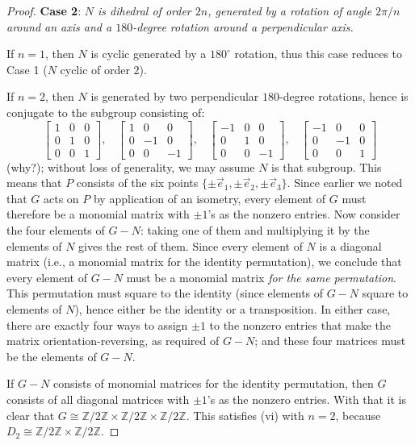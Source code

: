 \documentclass[leqno]{book}
\begin{document}
\begin{proof}
\noindent\textbf{Case 2}: \emph{$N$ is dihedral of order $2n$, generated by a rotation of angle $2\pi/n$ around an axis and a $180$-degree rotation around a perpendicular axis.}

If $n=1$, then $N$ is cyclic generated by a $180^\circ$ rotation, thus this case reduces to Case 1 ($N$ cyclic of order $2$).

If $n=2$, then $N$ is generated by two perpendicular $180$-degree rotations, hence is conjugate to the subgroup consisting of:
$$\begin{bmatrix}1&0&0\\0&1&0\\0&0&1\end{bmatrix},~~~~\begin{bmatrix}1&0&0\\0&-1&0\\0&0&-1\end{bmatrix},~~~~\begin{bmatrix}-1&0&0\\0&1&0\\0&0&-1\end{bmatrix},~~~~\begin{bmatrix}-1&0&0\\0&-1&0\\0&0&1\end{bmatrix}$$
(why?); without loss of generality, we may assume $N$ is that subgroup.  This means that $P$ consists of the six points $\{\pm\vec e_1,\pm\vec e_2,\pm\vec e_3\}$.  Since earlier we noted that $G$ acts on $P$ by application of an isometry, every element of $G$ must therefore be a monomial matrix with $\pm 1$'s as the nonzero entries.  Now consider the four elements of $G-N$: taking one of them and multiplying it by the elements of $N$ gives the rest of them.  Since every element of $N$ is a diagonal matrix (i.e., a monomial matrix for the identity permutation), we conclude that every element of $G-N$ must be a monomial matrix \emph{for the same permutation}.  This permutation must square to the identity (since elements of $G-N$ square to elements of $N$), hence either be the identity or a transposition.  In either case, there are exactly four ways to assign $\pm 1$ to the nonzero entries that make the matrix orientation-reversing, as required of $G-N$; and these four matrices must be the elements of $G-N$.

If $G-N$ consists of monomial matrices for the identity permutation, then $G$ consists of all diagonal matrices with $\pm 1$'s as the nonzero entries.  With that it is clear that $G\cong\mathbb Z/2\mathbb Z\times\mathbb Z/2\mathbb Z\times\mathbb Z/2\mathbb Z$.  This satisfies (vi) with $n=2$, because $D_2\cong\mathbb Z/2\mathbb Z\times\mathbb Z/2\mathbb Z$.


\end{proof}
\end{document}
